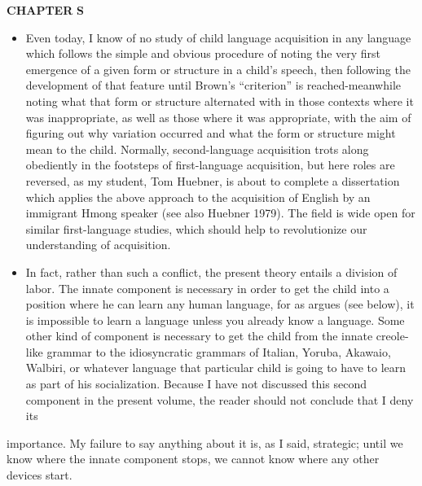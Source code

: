 \begin{itemize}
\begin{itemize}
\begin{itemize}
\begin{itemize}
\begin{itemize}
\begin{itemize}
\begin{itemize}
\textbf{CHAPTER} \textbf{S}

\begin{itemize}
\item Even today, I know of no study of child language acquisition in any language which follows the simple and obvious procedure of noting the very first emergence of a given form or structure in a child's speech, then following the development of that feature until Brown's ``criterion'' is reached-meanwhile noting what that form or structure alternated with in those contexts where it was inappropriate, as well as those where it was appropriate, with the aim of figuring out why variation occurred and what the form or structure might mean to the child. Normally, second-language acquisition trots along obediently in the footsteps of first-language acquisition, but here roles are reversed, as my student, Tom Huebner, is about to complete a dissertation which applies the above approach to the acquisition of English by an immi\-grant Hmong speaker (see also Huebner 1979). The field is wide open for similar first-language studies, which should help to revolutionize our understanding of acquisition.
\item In fact, rather than such a conflict, the present theory entails a division of labor. The innate component is necessary in order to get the child into a position where he can learn any human language, for as \citet{Fodor1975} argues (see below), it is impossible to learn a language unless you already know a language. Some other kind of component is necessary to get the child from the innate creole-like grammar to the idiosyncratic grammars of Italian, Yoruba, Akawaio, Walbiri, or what\-ever language that particular child is going to have to learn as part of his socialization. Because I have not discussed this second component in the present volume, the reader should not conclude that I deny its
\end{itemize}


importance. My failure to say anything about it is, as I said, strategic; until we know where the innate component stops, we cannot know where any other devices start.


\end{itemize}
\end{itemize}
\end{itemize}
\end{itemize}
\end{itemize}
\end{itemize}
\end{itemize}
